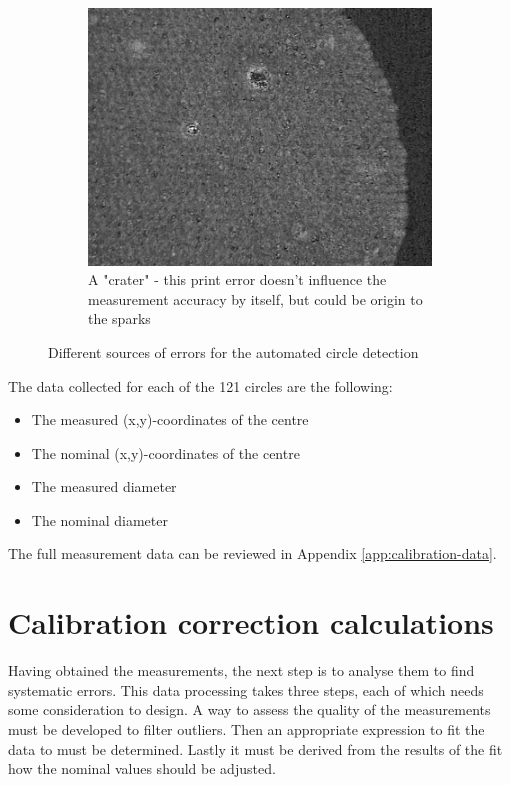 \begin{figure}[ht]
\begin{subfigure}{0.32\textwidth}
        \centering
        \includegraphics[width=\linewidth]{Pictures/crater.jpeg}
        \caption{A "crater" - this print error doesn't influence the measurement accuracy by itself, but could be origin to the sparks}
        \label{fig:crater}
    \end{subfigure}
    \caption{Different sources of errors for the automated circle detection}
    \label{fig:meas-error-sources}
\end{figure}

The data collected for each of the 121 circles are the following:
\begin{itemize}
    \item The measured (x,y)-coordinates of the centre
    \item The nominal (x,y)-coordinates of the centre
    \item The measured diameter
    \item The nominal diameter
\end{itemize}
The full measurement data can be reviewed in Appendix \ref{app:calibration-data}.

\section{Calibration correction calculations} \label{sec:cal-cal}
Having obtained the measurements, the next step is to analyse them to find systematic errors. This data processing takes three steps, each of which needs some consideration to design. A way to assess the quality of the measurements must be developed to filter outliers. Then an appropriate expression to fit the data to must be determined. Lastly it must be derived from the results of the fit how the nominal values should be adjusted.

